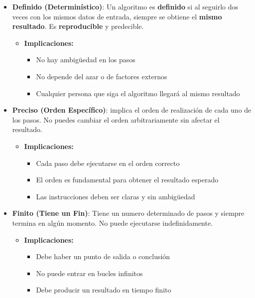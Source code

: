 \documentclass[
  spanish,
  12pt,
  letterpaper,
  DIV=11,
  numbers=noendperiod]{scrreprt}
\providecommand{\tightlist}{%
  \setlength{\itemsep}{0pt}\setlength{\parskip}{0pt}}
\begin{document}
\begin{itemize}
\tightlist
\item
  {\textbf{Definido (Determinístico)}}: Un algoritmo es
  \textbf{definido} si al seguirlo dos veces con los mismos datos de
  entrada, siempre se obtiene el \textbf{mismo resultado}. Es
  \textbf{reproducible} y predecible.

  \begin{itemize}
  \tightlist
  \item
    \textbf{Implicaciones:}

    \begin{itemize}
    \tightlist
    \item
      No hay ambigüedad en los pasos
    \item
      No depende del azar o de factores externos
    \item
      Cualquier persona que siga el algoritmo llegará al mismo resultado
    \end{itemize}
  \end{itemize}
\item
  {\textbf{Preciso (Orden Específico)}}: implica el orden de realización
  de cada uno de los pasos. No puedes cambiar el orden arbitrariamente
  sin afectar el resultado.

  \begin{itemize}
  \tightlist
  \item
    \textbf{Implicaciones:}

    \begin{itemize}
    \tightlist
    \item
      Cada paso debe ejecutarse en el orden correcto
    \item
      El orden es fundamental para obtener el resultado esperado
    \item
      Las instrucciones deben ser claras y sin ambigüedad
    \end{itemize}
  \end{itemize}
\item
  {\textbf{Finito (Tiene un Fin)}}: Tiene un numero determinado de pasos
  y siempre termina en algún momento. No puede ejecutarse
  indefinidamente.

  \begin{itemize}
  \tightlist
  \item
    \textbf{Implicaciones:}

    \begin{itemize}
    \item
      Debe haber un punto de salida o conclusión
    \item
      No puede entrar en bucles infinitos
    \item
      Debe producir un resultado en tiempo finito
    \end{itemize}
  \end{itemize}
\end{itemize}
\end{document}

